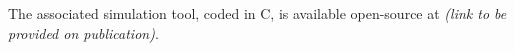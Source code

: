\begin{itemize}
    

\end{itemize}
The associated simulation tool, coded in C, is available open-source at \textit{(link to be provided on publication)}. %





